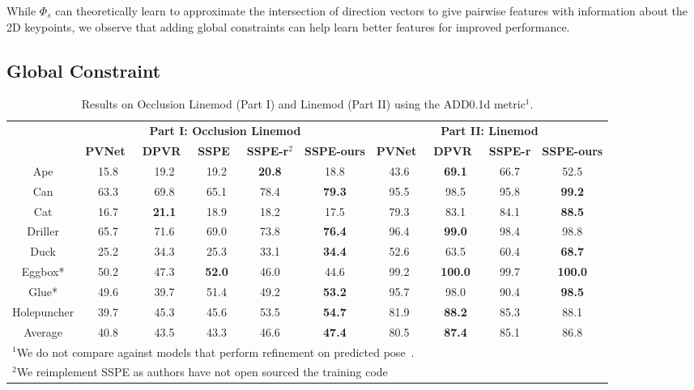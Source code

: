 \documentclass{article}
\begin{document}
While $\Phi_s$ can theoretically learn to approximate the intersection of direction vectors to give pairwise features with information about the 2D keypoints, we observe that adding global constraints can help learn better features for improved performance.





\subsection{Global Constraint}











\begin{table}[t]
\centering
\caption{Results on Occlusion Linemod (Part I) and Linemod (Part II) using the ADD0.1d metric$^1$.}
\label{tab:results-occlinemod}
\centering 
\scriptsize
\begin{tabular}{ c | c c c c c | c c c c }
\hline
& \multicolumn{5}{c|}{\textbf{Part I: Occlusion Linemod}} &  \multicolumn{4}{c}{\textbf{Part II: Linemod}}\\
& \textbf{PVNet}~\cite{peng2019pvnet} & \textbf{DPVR}~\cite{proxyvoting} & \textbf{SSPE}~\cite{hu2020single} & \textbf{SSPE-r}$^2$ & \textbf{SSPE-ours} & \textbf{PVNet}~\cite{peng2019pvnet} & \textbf{DPVR}~\cite{proxyvoting} & \textbf{SSPE-r} & \textbf{SSPE-ours}\\
\hline
Ape & 15.8 & 19.2 & 19.2 & \textbf{20.8} & 18.8 & 43.6 & \textbf{69.1} & 66.7 & 52.5\\
Can & 63.3 & 69.8 & 65.1 & 78.4 & \textbf{79.3} & 95.5 & 98.5 & 95.8 & \textbf{99.2}\\
Cat & 16.7 & \textbf{21.1} & 18.9 & 18.2 & 17.5 & 79.3 & 83.1 & 84.1 & \textbf{88.5}\\
Driller & 65.7 & 71.6 & 69.0 & 73.8 & \textbf{76.4} & 96.4 & \textbf{99.0} & 98.4 & 98.8\\
Duck & 25.2 & 34.3 & 25.3 & 33.1 & \textbf{34.4} & 52.6 & 63.5 & 60.4 & \textbf{68.7}\\
Eggbox* & 50.2 & 47.3 & \textbf{52.0} & 46.0 & 44.6 & 99.2 & \textbf{100.0} & 99.7 & \textbf{100.0}\\
Glue* & 49.6 & 39.7 & 51.4 & 49.2 & \textbf{53.2} & 95.7 & 98.0 & 90.4 & \textbf{98.5}\\
Holepuncher & 39.7 & 45.3 & 45.6 & 53.5 & \textbf{54.7} & 81.9 & \textbf{88.2} & 85.3 & 88.1\\
\hline
Average & 40.8 & 43.5 & 43.3 & 46.6 & \textbf{47.4} & 80.5 & \textbf{87.4} & 85.1 & 86.8\\
\hline

\multicolumn{10}{l}{$^1$We do not compare against models that perform refinement on predicted pose~\cite{li2018deepim}\cite{wang2019densefusion}.}\\
\multicolumn{10}{l}{$^2$We reimplement SSPE as authors have not open sourced the training code}
\end{tabular}
\end{table}
\end{document}
